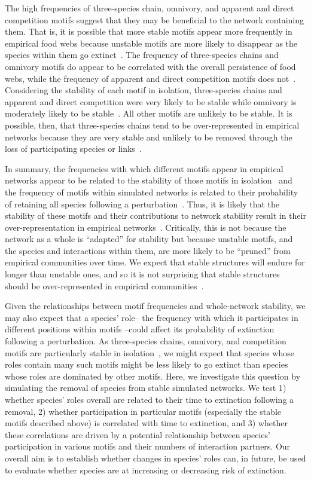\documentclass[12pt]{article}
\begin{document}
	The high frequencies of three-species chain, omnivory, and apparent and direct competition motifs suggest that they may be beneficial to the network containing them. That is, it is possible that more stable motifs appear more frequently in empirical food webs because unstable motifs are more likely to disappear as the species within them go extinct~\citep{Borrelli2015,Borrelli2015a}. The frequency of three-species chains and omnivory motifs do appear to be correlated with the overall persistence of  food webs, while the frequency of apparent and direct competition motifs does not~\citep{Stouffer2010}. Considering the stability of each motif in isolation, three-species chains and apparent and direct competition were very likely to be stable while omnivory is moderately likely to be stable~\citep{Borrelli2015a}. All other motifs are unlikely to be stable. It is possible, then, that three-species chains tend to be over-represented in empirical networks because they are very stable and unlikely to be removed through the loss of participating species or links~\citep{Borrelli2015}.  


	In summary, the frequencies with which different motifs appear in empirical networks appear to be related to the stability of those motifs in isolation~\citep{Stouffer2010b,Borrelli2015a} and the frequency of motifs within simulated networks is related to their probability of retaining all species following a perturbation~\citep{Stouffer2010b}. Thus, it is likely that the stability of these motifs and their contributions to network stability result in their over-representation in empirical networks~\citep{Borrelli2015}. Critically, this is not because the network as a whole is ``adapted'' for stability but because unstable motifs, and the species and interactions within them, are more likely to be ``pruned'' from empirical communities over time. We expect that stable structures will endure for longer than unstable ones, and so it is not surprising that stable structures should be over-represented in empirical communities~\citep{Borrelli2015}.


	Given the relationships between motif frequencies and whole-network stability, we may also expect that a species' role-- the frequency with which it participates in different positions within motifs --could affect its probability of extinction following a perturbation. As three-species chains, omnivory, and competition motifs are particularly stable in isolation~\citep{Borrelli2015a}, we might expect that species whose roles contain many such motifs might be less likely to go extinct than species whose roles are dominated by other motifs. Here, we investigate this question by simulating the removal of species from stable simulated networks. We test 1) whether species' roles overall are related to their time to extinction following a removal, 2) whether participation in particular motifs (especially the stable motifs described above) is correlated with time to extinction, and 3) whether these correlations are driven by a potential relationship between species' participation in various motifs and their numbers of interaction partners. Our overall aim is to establish whether changes in species' roles can, in future, be used to evaluate whether species are at increasing or decreasing risk of extinction.
\end{document}
